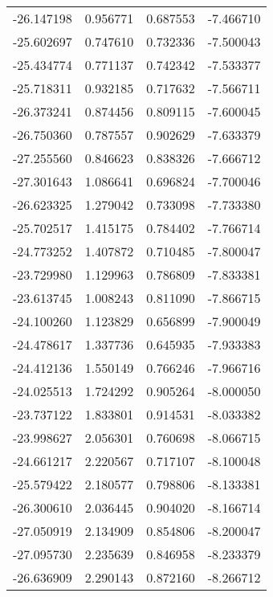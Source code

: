 \begin{tabular}{rrrr}
      -26.147198 &         0.956771 &    0.687553 &  -7.466710 \\
      -25.602697 &         0.747610 &    0.732336 &  -7.500043 \\
      -25.434774 &         0.771137 &    0.742342 &  -7.533377 \\
      -25.718311 &         0.932185 &    0.717632 &  -7.566711 \\
      -26.373241 &         0.874456 &    0.809115 &  -7.600045 \\
      -26.750360 &         0.787557 &    0.902629 &  -7.633379 \\
      -27.255560 &         0.846623 &    0.838326 &  -7.666712 \\
      -27.301643 &         1.086641 &    0.696824 &  -7.700046 \\
      -26.623325 &         1.279042 &    0.733098 &  -7.733380 \\
      -25.702517 &         1.415175 &    0.784402 &  -7.766714 \\
      -24.773252 &         1.407872 &    0.710485 &  -7.800047 \\
      -23.729980 &         1.129963 &    0.786809 &  -7.833381 \\
      -23.613745 &         1.008243 &    0.811090 &  -7.866715 \\
      -24.100260 &         1.123829 &    0.656899 &  -7.900049 \\
      -24.478617 &         1.337736 &    0.645935 &  -7.933383 \\
      -24.412136 &         1.550149 &    0.766246 &  -7.966716 \\
      -24.025513 &         1.724292 &    0.905264 &  -8.000050 \\
      -23.737122 &         1.833801 &    0.914531 &  -8.033382 \\
      -23.998627 &         2.056301 &    0.760698 &  -8.066715 \\
      -24.661217 &         2.220567 &    0.717107 &  -8.100048 \\
      -25.579422 &         2.180577 &    0.798806 &  -8.133381 \\
      -26.300610 &         2.036445 &    0.904020 &  -8.166714 \\
      -27.050919 &         2.134909 &    0.854806 &  -8.200047 \\
      -27.095730 &         2.235639 &    0.846958 &  -8.233379 \\
      -26.636909 &         2.290143 &    0.872160 &  -8.266712 \\

\end{tabular}
